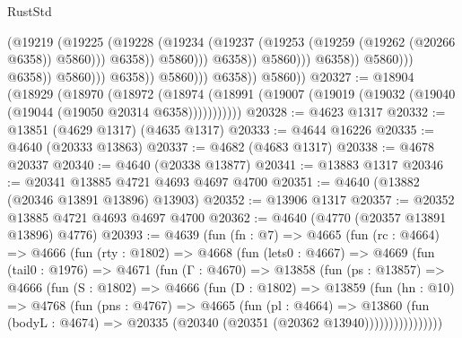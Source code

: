 \begin{lexlean}{RustStd}
\begin{coremodule}
                                                      (@19219
                                                        (@19225
                                                          (@19228
                                                            (@19234
                                                              (@19237
                                                                (@19253
                                                                  (@19259
                                                                    (@19262 (@20266 @6358))
                                                                    @5860)))
                                                              @6358))
                                                          @5860)))
                                                    @6358))
                                                @5860)))
                                          @6358))
                                      @5860)))
                                @6358))
                            @5860)))
                      @6358))
                  @5860)))
            @6358))
        @5860))
@20327 := @18904
    (@18929
      (@18970
        (@18972
          (@18974 (@18991 (@19007 (@19019 (@19032 (@19040 (@19044 (@19050 @20314 @6358)))))))))))
@20328 := @4623 @1317
@20332 := @13851 (@4629 @1317) (@4635 @1317)
@20333 := @4644 @16226
@20335 := @4640 (@20333 @13863)
@20337 := @4682 (@4683 @1317)
@20338 := @4678 @20337
@20340 := @4640 (@20338 @13877)
@20341 := @13883 @1317
@20346 := @20341 @13885 @4721 @4693 @4697 @4700
@20351 := @4640 (@13882 (@20346 @13891 @13896) @13903)
@20352 := @13906 @1317
@20357 := @20352 @13885 @4721 @4693 @4697 @4700
@20362 := @4640 (@4770 (@20357 @13891 @13896) @4776)
@20393 := @4639
    (fun (fn : @7) =>
    @4665
      (fun (rc : @4664) =>
      @4666
        (fun (rty : @1802) =>
        @4668
          (fun (lets0 : @4667) =>
          @4669
            (fun (tail0 : @1976) =>
            @4671
              (fun (Γ : @4670) =>
              @13858
                (fun (ps : @13857) =>
                @4666
                  (fun (S : @1802) =>
                  @4666
                    (fun (D : @1802) =>
                    @13859
                      (fun (hn : @10) =>
                      @4768
                        (fun (pns : @4767) =>
                        @4665
                          (fun (pl : @4664) =>
                          @13860
                            (fun (bodyL : @4674) =>
                            @20335 (@20340 (@20351 (@20362 @13940))))))))))))))))

\end{coremodule}
\end{lexlean}
